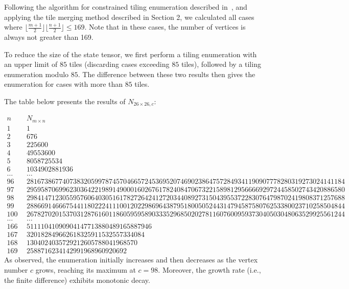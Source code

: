 \documentclass[11pt]{article}
\begin{document}
    Following the algorithm for constrained tiling enumeration described in~\cite{tilEnum}, and applying the tile merging method described in Section 2, we calculated all cases where
    $\lfloor\frac{m+1}{2}\rfloor\lfloor\frac{n+1}{2}\rfloor\leq169$.
    Note that in these cases, the number of vertices is always not greater than 169.

    To reduce the size of the state tensor, we first perform a tiling enumeration with an upper limit of $85$ tiles (discarding cases exceeding $85$ tiles), followed by a tiling enumeration modulo $85$.
    The difference between these two results then gives the enumeration for cases with more than $85$ tiles.

    The table below presents the results of $N_{26\times26,c}$:

    \tiny
    \begin{align*}
        n~~ & N_{m\times n}\\
        1~~ & 1 \\
        2~~ & 676\\
        3~~ & 225600\\
        4~~ & 49553600\\
        5~~ & 8058725534\\
        6~~ & 1034902881936\\
        \ldots&\ldots\\
        96~~ & 28167386774073832059978745704665724536952074690238647572849341190907778280319273024141184\\
        97~~ & 29595870699623036422198914900016026761782408470673221589812956666929724458502743420886580\\
        98~~ & 29841471230559576064030516178272642412720344089273150439553722830764798702419808371257688\\
        99~~ & 28866914666754411802224111001202298696438795180050524431479458758076253380023710258504844\\
        100~~ & 26782702015370312876160118605959589033352968502027811607600959373040503048063529925561244\\
        \ldots&\ldots\\
        166~~ & 51111041090904147713880489165887946\\
        167~~ & 320182849662618325911532557334084\\
        168~~ & 1304024035729212605788041968570\\
        169~~ & 2588716234142991968960920692
    \end{align*}
    \normalsize
    As observed, the enumeration initially increases and then decreases as the vertex number $c$ grows, reaching its maximum at $c = 98$.
    Moreover, the growth rate (i.e., the finite difference) exhibits monotonic decay.
\end{document}

